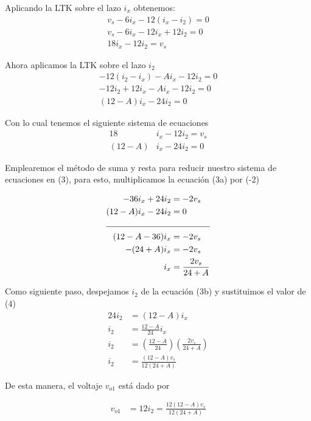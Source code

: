 \documentclass{article}
\begin{document}
	\noindent Aplicando la LTK sobre el lazo $i_x$ obtenemos:
	\begin{align}
		v_s - 6i_x - 12(i_x - i_2) = 0\nonumber\\
		v_s - 6i_x - 12i_x + 12i_2 = 0\nonumber\\
		18i_x - 12i_2 = v_s
	\end{align}
	
	\noindent Ahora aplicamos la LTK sobre el lazo $i_2$
	\begin{align}
		-12(i_2 - i_x) - Ai_x - 12i_2 = 0\nonumber\\
		-12i_2 + 12i_x - Ai_x - 12i_2 = 0\nonumber\\
		(12-A)i_x - 24i_2 = 0
	\end{align}

	\noindent Con lo cual tenemos el siguiente sistema de ecuaciones
	\begin{subequations}
		\begin{align}
			18 & i_x - 12i_2 = v_s\\
			(12-A)& i_x - 24i_2 = 0
		\end{align}	
	\end{subequations}
	
	\noindent Emplearemos el método de suma y resta para reducir nuestro sistema de ecuaciones en (3), para esto, multiplicamos la ecuación (3a) por (-2)
	
	\begin{align}
		-36i_x + 24i_2 &= -2v_s\nonumber\\
		(12-A)i_x - 24i_2 & = 0\nonumber \\
		\cline{1-2}
		(12-A-36)i_x  &= -2v_s\nonumber\\
		-(24+A)i_x &= -2v_s\nonumber\\
		i_x &= \frac{2v_s}{24+A} 
	\end{align}
	
	\noindent Como siguiente paso, despejamos $i_2$ de la ecuación (3b) y sustituimos el valor de (4)
	\begin{align}
		24i_2 &= (12-A)i_x\nonumber\\
		i_2 &= \frac{12-A}{24}i_x\nonumber\\
		i_2 &= \left( \frac{12-A}{24} \right)\left( \frac{2v_s}{24+A} \right)\nonumber\\
		i_2 &= \frac{(12-A)v_s}{12(24+A)} 
	\end{align}
	
	\noindent De esta manera, el voltaje $v_{o1}$ está dado por
	
	\begin{align}
		v_{o1} &= 12i_2 = \frac{12(12-A)v_s}{12(24+A)}\nonumber
	\end{align}
	
\end{document}
